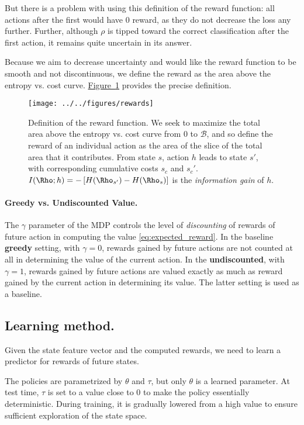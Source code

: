 But there is a problem with using this definition of the reward function: all actions after the first would have 0 reward, as they do not decrease the loss any further.
Further, although $\rho$ is tipped toward the correct classification after the first action, it remains quite uncertain in its answer.

Because we aim to decrease uncertainty and would like the reward function to be smooth and not discontinuous, we define the reward as the area above the entropy vs. cost curve.
\hyperref[fig:rewards]{Figure~\ref*{fig:rewards}} provides the precise definition.

\begin{figure}[t]
\texttt{[image: ../../figures/rewards]}
\caption{Definition of the reward function.
We seek to maximize the total area above the entropy vs. cost curve from $0$ to $\mathcal{B}$, and so define the reward of an individual action as the area of the slice of the total area that it contributes.
From state $s$, action $h$ leads to state $s'$, with corresponding cumulative costs $s_c$ and $s_c'$.
${I(\Rho; h) = -\left[ H(\Rho_{s'}) - H(\Rho_s) \right]}$ is the \emph{information gain} of $h$.}
\label{fig:rewards}
\end{figure}


\paragraph{Greedy vs. Undiscounted Value.}
The $\gamma$ parameter of the MDP controls the level of \emph{discounting} of rewards of future action in computing the value \eqref{eq:expected_reward}.
In the baseline \textbf{greedy} setting, with $\gamma=0$, rewards gained by future actions are not counted at all in determining the value of the current action.
In the \textbf{undiscounted}, with $\gamma=1$, rewards gained by future actions are valued exactly as much as reward gained by the current action in determining its value.
The latter setting is used as a baseline.

\subsection{Learning method.}
Given the state feature vector and the computed rewards, we need to learn a predictor for rewards of future states.

The policies are parametrized by $\theta$ and $\tau$, but only $\theta$ is a learned parameter.
At test time, $\tau$ is set to a value close to $0$ to make the policy essentially deterministic.
During training, it is gradually lowered from a high value to ensure sufficient exploration of the state space.

